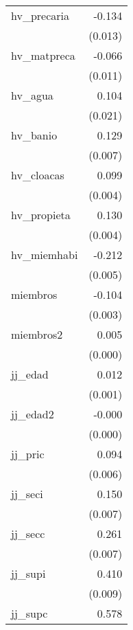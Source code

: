 {\begin{longtable}{l*{1}{D{.}{.}{-1}}}
\addlinespace
hv\_precaria &      -0.134\sym{***}\\
            &     (0.013)         \\
\addlinespace
hv\_matpreca &      -0.066\sym{***}\\
            &     (0.011)         \\
\addlinespace
hv\_agua     &       0.104\sym{***}\\
            &     (0.021)         \\
\addlinespace
hv\_banio    &       0.129\sym{***}\\
            &     (0.007)         \\
\addlinespace
hv\_cloacas  &       0.099\sym{***}\\
            &     (0.004)         \\
\addlinespace
hv\_propieta &       0.130\sym{***}\\
            &     (0.004)         \\
\addlinespace
hv\_miemhabi &      -0.212\sym{***}\\
            &     (0.005)         \\
\addlinespace
miembros    &      -0.104\sym{***}\\
            &     (0.003)         \\
\addlinespace
miembros2   &       0.005\sym{***}\\
            &     (0.000)         \\
\addlinespace
jj\_edad     &       0.012\sym{***}\\
            &     (0.001)         \\
\addlinespace
jj\_edad2    &      -0.000\sym{***}\\
            &     (0.000)         \\
\addlinespace
jj\_pric     &       0.094\sym{***}\\
            &     (0.006)         \\
\addlinespace
jj\_seci     &       0.150\sym{***}\\
            &     (0.007)         \\
\addlinespace
jj\_secc     &       0.261\sym{***}\\
            &     (0.007)         \\
\addlinespace
jj\_supi     &       0.410\sym{***}\\
            &     (0.009)         \\
\addlinespace
jj\_supc     &       0.578\sym{***}\\

\end{longtable}}
